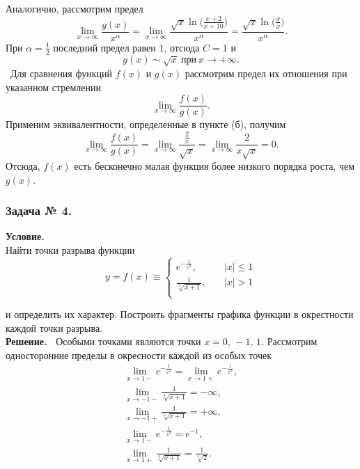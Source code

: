 \documentclass{article}
\begin{document}
\begin{flushleft}
$$$$
Аналогично, рассмотрим предел
$$
\lim\limits_{x\rightarrow\infty}\dfrac{g(x)}{x^{\alpha}} = 
\lim\limits_{x\rightarrow\infty}\frac{\sqrt{x}\ln\biggl(\frac{x+2}{x+10}\biggl)}{x^\alpha} = \frac{\sqrt{x}\ln\biggl(\frac{x}{x}\biggl)}{x^\alpha}.
$$
При $\alpha=\frac12$ последний предел равен $1$, отсюда $C=1$ и
$$
g(x)\sim \sqrt{x}~\text{при}~x\rightarrow+\infty.
$$
~Для сравнения функций $f(x)$ и $g(x)$ рассмотрим предел их отношения при указанном стремлении
$$
\lim\limits_{x\rightarrow\infty}\frac{f(x)}{g(x)}.
$$
Применим эквивалентности, определенные в пункте (б), получим
$$
\lim\limits_{x\rightarrow\infty}\frac{f(x)}{g(x)} = 
\lim\limits_{x\rightarrow\infty}\frac{\frac{2}{x}}{\sqrt{x}} = 
\lim\limits_{x\rightarrow\infty} \frac{2}{x\sqrt{x}} = 0.  
$$
Отсюда, $f(x)$ есть бесконечно малая функция более низкого порядка роста, чем $g(x)$.

\subsubsection*{\center Задача № 4.}
{\bf Условие.~}\\
Найти точки разрыва функции 
$$
y = f(x) \equiv 
\left\{
\begin{array}{rcl}
e^{-\frac{1}{x^2}},   &\quad |x|\leq1\\
\frac{1}{\sqrt[3]{x+1}}, &\quad |x|>1\\
\end{array}
\right.
$$
 
и определить их характер. Построить фрагменты графика функции в окрестности каждой точки разрыва. \\
{\bf Решение.~}	
Особыми точками являются точки $x=0,\,-1,\, 1$. Рассмотрим односторонние пределы в окресности каждой из особых точек
$$
\begin{array}{ll}
\lim\limits_{x\rightarrow 1-} e^{-\frac{1}{x^2}} = \lim\limits_{x\rightarrow 1+} e^{-\frac{1}{x^2}}, \\
\lim\limits_{x\rightarrow -1-} \frac{1}{\sqrt[3]{x+1}} = -\infty,\\ 
\lim\limits_{x\rightarrow -1+} \frac{1}{\sqrt[3]{x+1}} = +\infty, \\
\lim\limits_{x\rightarrow 1-} e^{-\frac{1}{x^2}} = e^{-1}, \\
\lim\limits_{x\rightarrow 1+} \frac{1}{\sqrt[3]{x+1}} = \frac{1}{\sqrt[3]{2}}.\\  
\end{array}
$$
\begin{center}
	\begin{tikzpicture}
	

\end{tikzpicture}
\end{center}
\end{flushleft}
\end{document}
